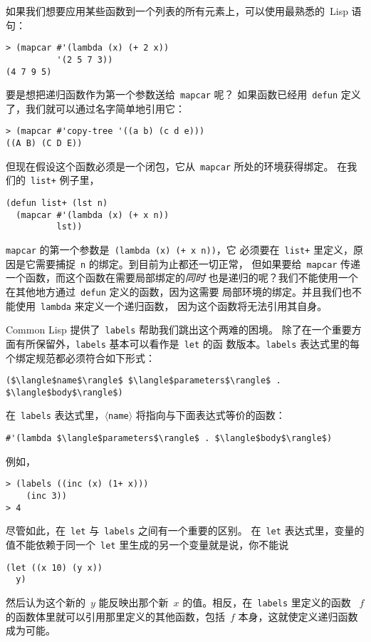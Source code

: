 如果我们想要应用某些函数到一个列表的所有元素上，可以使用最熟悉的~Lisp 语句：
\begin{lstlisting}
> (mapcar #'(lambda (x) (+ 2 x))
          '(2 5 7 3))
(4 7 9 5)
\end{lstlisting}
要是想把递归函数作为第一个参数送给~\texttt{mapcar} 呢？
如果函数已经用~\texttt{defun} 定义了，我们就可以通过名字简单地引用它：
\begin{lstlisting}
> (mapcar #'copy-tree '((a b) (c d e)))
((A B) (C D E))
\end{lstlisting}
但现在假设这个函数必须是一个闭包，它从~\texttt{mapcar} 所处的环境获得绑定。
在我们的~\texttt{list+} 例子里，
\begin{lstlisting}
(defun list+ (lst n)
  (mapcar #'(lambda (x) (+ x n))
          lst))
\end{lstlisting}
\texttt{mapcar} 的第一个参数是~\texttt{\sq(lambda (x) (+ x n))}，它
必须要在~\texttt{list+} 里定义，原因是它需要捕捉~\texttt{n} 的绑定。到目前为止都还一切正常，
但如果要给~\texttt{mapcar} 传递一个函数，而这个函数在需要局部绑定的\emph{同时}%
也是递归的呢？我们不能使用一个在其他地方通过~\texttt{defun} 定义的函数，因为这需要
局部环境的绑定。并且我们也不能使用~\texttt{lambda} 来定义一个递归函数，
因为这个函数将无法引用其自身。

Common Lisp 提供了~\texttt{labels} 帮助我们跳出这个两难的困境。
除了在一个重要方面有所保留外，\texttt{labels} 基本可以看作是~\texttt{let} 的函
数版本。\texttt{labels} 表达式里的每个绑定规范都必须符合如下形式：
\begin{lstlisting}
($\langle$name$\rangle$ $\langle$parameters$\rangle$ . $\langle$body$\rangle$)
\end{lstlisting}
在~\texttt{labels} 表达式里，\texttt{$\langle$name$\rangle$}
将指向与下面表达式等价的函数：
\begin{lstlisting}
#'(lambda $\langle$parameters$\rangle$ . $\langle$body$\rangle$)
\end{lstlisting}
例如，
\begin{lstlisting}
> (labels ((inc (x) (1+ x)))
    (inc 3))
> 4
\end{lstlisting}
尽管如此，在~\texttt{let} 与~\texttt{labels} 之间有一个重要的区别。
在~\texttt{let} 表达式里，变量的值不能依赖于同一个~\texttt{let} 里生成的另一个变量\pozhehao{}就是说，你不能说
\begin{lstlisting}
(let ((x 10) (y x))
  y)
\end{lstlisting}
然后认为这个新的~$y$ 能反映出那个新~$x$ 的值。相反，在~\texttt{labels} 里定义的函数
~$f$ 的函数体里就可以引用那里定义的其他函数，包括~$f$ 本身，这就使定义递归函数成为可能。

